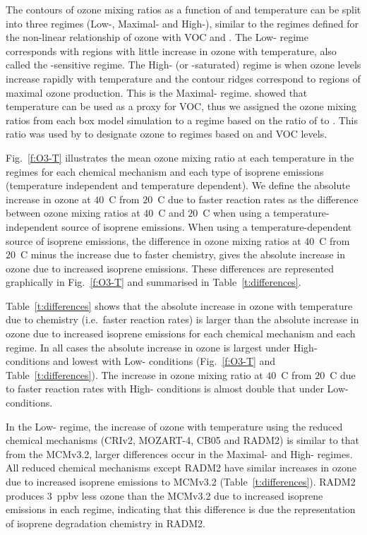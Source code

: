 The contours of ozone mixing ratios as a function of  and temperature can be split into three  regimes (Low-, Maximal- and High-), similar to the  regimes defined for the non-linear relationship of ozone with VOC and .
The Low- regime corresponds with regions with little increase in ozone with temperature, also called the -sensitive regime.
The High- (or -saturated) regime is when ozone levels increase rapidly with temperature and the contour ridges correspond to regions of maximal ozone production.
This is the Maximal- regime.
\citet{Pusede:2014} showed that temperature can be used as a proxy for VOC, thus we assigned the ozone mixing ratios from each box model simulation to a  regime based on the ratio of  to .
This ratio was used by \citet{Sillman:1995} to designate ozone to  regimes based on  and VOC levels.

Fig.~\ref{f:O3-T} illustrates the mean ozone mixing ratio at each temperature in the  regimes for each chemical mechanism and each type of isoprene emissions (temperature independent and temperature dependent).  
We define the absolute increase in ozone at $40$~\degree C from $20$~\degree C due to faster reaction rates as the difference between ozone mixing ratios at $40$~\degree C and $20$~\degree C when using a temperature-independent source of isoprene emissions.
When using a temperature-dependent source of isoprene emissions, the difference in ozone mixing ratios at $40$~\degree C from $20$~\degree C minus the increase due to faster chemistry, gives the absolute increase in ozone due to increased isoprene emissions.
These differences are represented graphically in Fig.~\ref{f:O3-T} and summarised in Table~\ref{t:differences}.

Table~\ref{t:differences} shows that the absolute increase in ozone with temperature due to chemistry (i.e.~faster reaction rates) is larger than the absolute increase in ozone due to increased isoprene emissions for each chemical mechanism and each  regime.
In all cases the absolute increase in ozone is largest under High- conditions and lowest with Low- conditions (Fig.~\ref{f:O3-T} and Table~\ref{t:differences}).
The increase in ozone mixing ratio at $40$~\degree C from $20$~\degree C due to faster reaction rates with High- conditions is almost double that under Low- conditions.

In the Low- regime, the increase of ozone with temperature using the reduced chemical mechanisms (CRIv2, MOZART-4, CB05 and RADM2) is similar to that from the MCMv3.2, larger differences occur in the Maximal- and High- regimes.
All reduced chemical mechanisms except RADM2 have similar increases in ozone due to increased isoprene emissions to MCMv3.2 (Table~\ref{t:differences}).
RADM2 produces $3$~ppbv less ozone than the MCMv3.2 due to increased isoprene emissions in each  regime, indicating that this difference is due the representation of isoprene degradation chemistry in RADM2.

